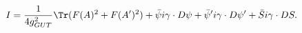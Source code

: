 \begin{equation}\label{omigo}
I={1\over 4g_{GUT}^2}\Tr (F(A)^2+F(A')^2) +\bar \psi i\gamma\cdot D
\psi +\bar\psi' i\gamma\cdot D \psi' +\bar Si\gamma\cdot D S.
\end{equation}

